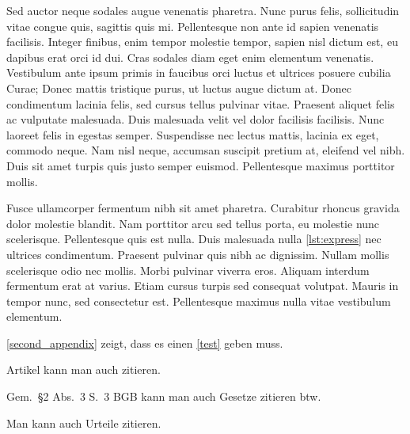 \documentclass[%
    auto-generate   = true,             %
    debug           = true,             %
    print-ndn       = true,             %
    print-loa       = true,             %
    print-lof       = true,             %
    print-lot       = true,             %
    print-lol       = true,             %
    bib-file        = literature.bib,   %
    plantuml        = true,             %
    title-style     = default,          %
    font-size       = 12pt              %
]{udhbwvst}
\begin{document}
Sed auctor neque sodales augue venenatis pharetra. Nunc purus felis, sollicitudin vitae congue quis, sagittis quis mi. Pellentesque non ante id sapien venenatis facilisis. Integer finibus, enim tempor molestie tempor, sapien nisl dictum est, eu dapibus erat orci id dui. Cras sodales diam eget enim elementum venenatis. Vestibulum ante ipsum primis in faucibus orci luctus et ultrices posuere cubilia Curae; Donec mattis tristique purus, ut luctus augue dictum at. Donec condimentum lacinia felis, sed cursus tellus pulvinar vitae. Praesent aliquet felis ac vulputate malesuada. Duis malesuada velit vel dolor facilisis facilisis. Nunc laoreet felis in egestas semper. Suspendisse nec lectus mattis, lacinia ex eget, commodo neque. Nam nisl neque, accumsan suscipit pretium at, eleifend vel nibh. Duis sit amet turpis quis justo semper euismod. Pellentesque maximus porttitor mollis.


Fusce ullamcorper fermentum nibh sit amet pharetra. Curabitur rhoncus gravida dolor molestie blandit. Nam porttitor arcu sed tellus porta, eu molestie nunc scelerisque. Pellentesque quis est nulla. Duis malesuada nulla \autoref{lst:express} nec ultrices condimentum. Praesent pulvinar quis nibh ac dignissim. Nullam mollis scelerisque odio nec mollis. Morbi pulvinar viverra eros. Aliquam interdum fermentum erat at varius. Etiam cursus turpis sed consequat volutpat. Mauris in tempor nunc, sed consectetur est. Pellentesque maximus nulla vitae vestibulum elementum. 

\blinddocument

\autoref{second_appendix} zeigt, dass es einen \autoref{test} geben muss.

Artikel kann man auch zitieren.

Gem.\ §2 Abs.\ 3 S.\ 3 BGB kann man auch Gesetze zitieren btw.\nocite{bgb}

Man kann auch Urteile zitieren.

\begin{dhbwappendices}

    \lipsum

    \lipsum

\end{dhbwappendices}
\end{document}
